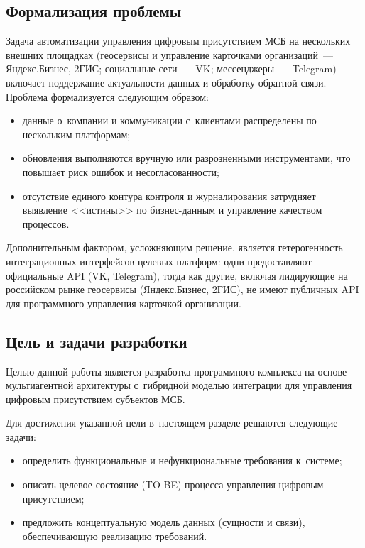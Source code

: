 \subsection{Формализация проблемы}
\label{subsec:problem}

Задача автоматизации управления цифровым присутствием МСБ на нескольких внешних площадках (геосервисы и управление карточками организаций~--- Яндекс.Бизнес, 2ГИС; социальные сети~--- VK; мессенджеры~--- Telegram) включает поддержание актуальности данных и обработку обратной связи. Проблема формализуется следующим образом:

\begin{itemize}
  \item данные о~компании и коммуникации с~клиентами распределены по нескольким платформам;
  \item обновления выполняются вручную или разрозненными инструментами, что повышает риск ошибок и несогласованности;
  \item отсутствие единого контура контроля и журналирования затрудняет выявление <<истины>> по бизнес-данным и управление качеством процессов.
\end{itemize}

Дополнительным фактором, усложняющим решение, является гетерогенность интеграционных интерфейсов целевых платформ: одни предоставляют официальные API (VK, Telegram), тогда как другие, включая лидирующие на российском рынке геосервисы (Яндекс.Бизнес, 2ГИС), не имеют публичных API для программного управления карточкой организации.

\subsection{Цель и задачи разработки}
\label{subsec:goals}

Целью данной работы является разработка программного комплекса на основе мультиагентной архитектуры с~гибридной моделью интеграции для управления цифровым присутствием субъектов МСБ.

Для достижения указанной цели в~настоящем разделе решаются следующие задачи:

\begin{itemize}
  \item определить функциональные и нефункциональные требования к~системе;
  \item описать целевое состояние (TO-BE) процесса управления цифровым присутствием;
  \item предложить концептуальную модель данных (сущности и связи), обеспечивающую реализацию требований.
\end{itemize}

